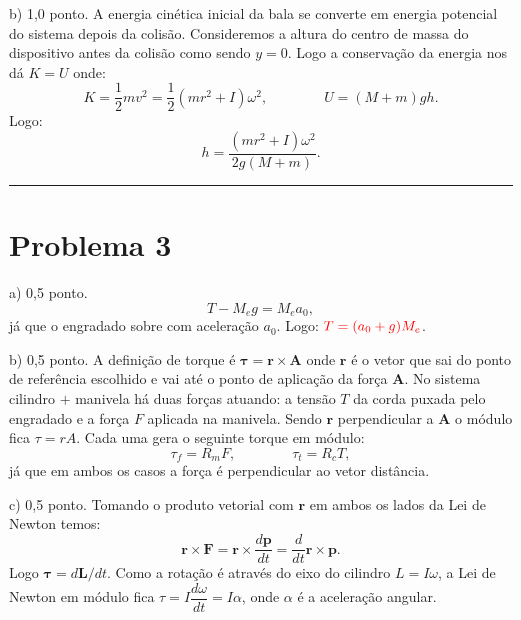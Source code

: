 \documentclass[a4paper, 11pt]{article}
\begin{document}
{\color{red}b) 1,0 ponto.} A energia cinética inicial da bala se converte em energia potencial do sistema depois da colisão. Consideremos a altura do centro de massa do dispositivo antes da colisão como sendo $y=0$. Logo a conservação da energia nos dá $K = U$ onde:
\begin{equation}
K = \frac{1}{2}mv^2 = \frac{1}{2} (mr^2 +I) \omega^2, \qquad \qquad U = (M+m)gh. \nonumber
\end{equation}
Logo: 
{\color{red}
\begin{equation}
h=\dfrac{(mr^2+I)\omega^2}{2g(M+m)}. \nonumber
\end{equation}} 

 {\noindent\def\stackalignment{l}{\textcolor{lightcyan}{\rule{\linewidth}{2pt}}}\medskip}

\section*{Problema 3} 

{\color{red}a) 0,5 ponto.}
\begin{equation}
T - M_e g = M_e a_0, \nonumber
\end{equation}
já que o engradado sobre com aceleração $a_0$. Logo: ${\color{red}T = (a_0+g)M_e}$.

{\color{red}b) 0,5 ponto.} A definição de torque é $\bm{\tau} = \textbf{r} \times \textbf{A}$ onde $\textbf{r}$ é o vetor que sai do ponto de referência escolhido e vai até o ponto de aplicação da força $\textbf{A}$. No sistema cilindro $+$ manivela há duas forças atuando: a tensão $T$ da corda puxada pelo engradado e a força $F$ aplicada na manivela. Sendo $\textbf{r}$ perpendicular a $\textbf{A}$ o módulo fica $\tau = rA$. Cada uma gera o seguinte torque em módulo:
{\color{red}
\begin{equation}
\tau_f = R_m F, \qquad \qquad \tau_t = R_c T, \nonumber
\end{equation}} 
já que em ambos os casos a força é perpendicular ao vetor distância.


{\color{red}c) 0,5 ponto.} Tomando o produto vetorial com $\textbf{r}$ em ambos os lados da Lei de Newton temos:
\begin{equation}
\textbf{r} \times  \textbf{F} = \textbf{r} \times  \dfrac{d\textbf{p}}{dt} =  \dfrac{d}{dt}\textbf{r} \times \textbf{p}. \nonumber 
\end{equation}
Logo $\bm{\tau} = d \textbf{L}/dt$. Como a rotação é através do eixo do cilindro $L=I\omega$, a Lei de Newton em módulo fica $\tau = I \dfrac{d\omega}{dt} = I \alpha$, onde $\alpha$ é a aceleração angular.
\end{document}
